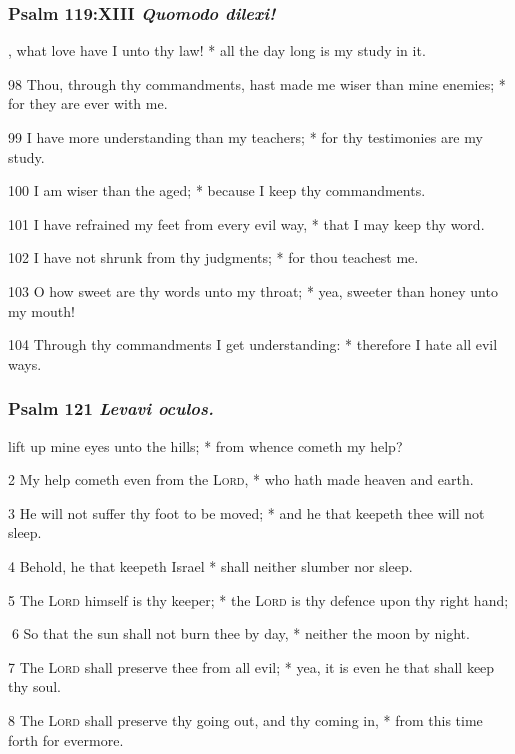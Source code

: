 \subsubsection{Psalm 119:XIII \textit{Quomodo dilexi!}}
, what love have I unto thy law! * all the day long is my study in it.
\par
    98 Thou, through thy commandments, hast made me wiser than mine enemies; * for they are ever with me.
\par
    99 I have more understanding than my teachers; * for thy testimonies are my study.
\par
    100 I am wiser than the aged; * because I keep thy commandments.
\par
    101 I have refrained my feet from every evil way, * that I may keep thy word.
\par
    102 I have not shrunk from thy judgments; * for thou teachest me.
\par
    103 O how sweet are thy words unto my throat; * yea, sweeter than honey unto my mouth!
\par
    104 Through thy commandments I get understanding: * therefore I hate all evil ways. 
\subsubsection{Psalm 121 \textit{Levavi oculos.}}
 lift up mine eyes unto the hills; * from whence cometh my help?
\par
    2 My help cometh even from the \textsc{Lord}, * who hath made heaven and earth.
\par
    3 He will not suffer thy foot to be moved; * and he that keepeth thee will not sleep.
\par
    4 Behold, he that keepeth Israel * shall neither slumber nor sleep.
\par
    5 The \textsc{Lord} himself is thy keeper; * the \textsc{Lord} is thy defence upon thy right hand;
\par6 So that the sun shall not burn thee by day, * neither the moon by night.
\par
    7 The \textsc{Lord} shall preserve thee from all evil; * yea, it is even he that shall keep thy soul.
\par
    8 The \textsc{Lord} shall preserve thy going out, and thy coming in, * from this time forth for evermore.
